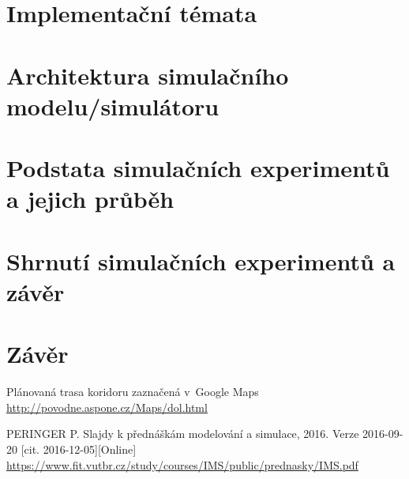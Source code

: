 \documentclass[12pt,a4paper,titlepage]{article}
\begin{document}
\section{Implementační témata}
\section{Architektura simulačního modelu/simulátoru}
\section{Podstata simulačních experimentů a jejich průběh}
\section{Shrnutí simulačních experimentů a závěr}

\section{Závěr}
\begin{enumerate}[label={[\arabic*]}]
\item Plánovaná trasa koridoru zaznačená v~Google Maps \\
        \href{http://povode.aspone.cz/Maps/dol.html}
             {http://povodne.aspone.cz/Maps/dol.html} \label{google-mapa}
      \item PERINGER P. Slajdy k přednáškám modelování a simulace, 2016. Verze  2016-09-20 [cit. 2016-12-05][Online] \\ 
             \href{https://www.fit.vutbr.cz/study/courses/IMS/public/prednasky/IMS.pdf}
             {https://www.fit.vutbr.cz/study/courses/IMS/public/prednasky/IMS.pdf}\label{prezentace}
\end{enumerate}
\end{document}

